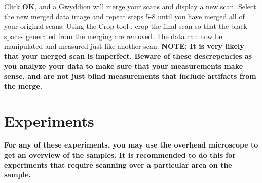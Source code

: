 \documentclass{../lab}
\begin{document}
\textbf{​}Click \textbf{OK}, and a Gwyddion will merge your scans and display a new scan.
\textbf{​}Select the new merged data image and repeat steps 5-8 until you have merged all of your original scans.
Using the Crop tool , crop the final scan so that the black spaces generated from the merging are removed.
The data can now be manipulated and measured just like another scan.
\textbf{NOTE: It is very likely that your merged scan is imperfect.  Beware of these descrepencies as you analyze your data to make sure that your measurements make sense, and are not just blind measurements that include artifacts from the merge.}\section{Experiments}

\textbf{For any of these experiments, you may use the overhead microscope to get an overview of the samples.  It is recommended to do this for experiments that require scanning over a particular area on the sample.}
\end{document}
